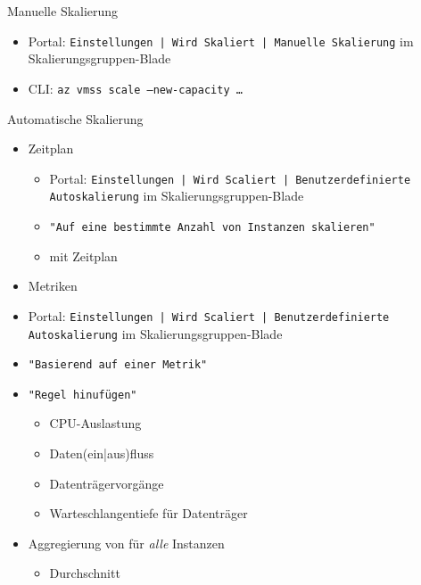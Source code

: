 \begin{flashcard}[Definition]{Manuelle Skalierung}
    \begin{itemize}
        \item Portal: \texttt{Einstellungen | Wird Skaliert | Manuelle Skalierung} im Skalierungsgruppen-Blade
        \item CLI: \texttt{az vmss scale --new-capacity \ldots}
    \end{itemize}
\end{flashcard}

\begin{flashcard}[Definition]{Automatische Skalierung}
    \begin{itemize}
        \item Zeitplan
            \begin{itemize}
                \item Portal: \texttt{Einstellungen | Wird Scaliert | Benutzerdefinierte Autoskalierung} im Skalierungsgruppen-Blade
                \item \texttt{"Auf eine bestimmte Anzahl von Instanzen skalieren"}
                \item mit Zeitplan
            \end{itemize}
        \item Metriken
            \item Portal: \texttt{Einstellungen | Wird Scaliert | Benutzerdefinierte Autoskalierung} im Skalierungsgruppen-Blade
            \item \texttt{"Basierend auf einer Metrik"}
            \item \texttt{"Regel hinufügen"}
            \begin{itemize}
                \item CPU-Auslastung
                \item Daten(ein|aus)fluss
                \item Datenträgervorgänge
                \item Warteschlangentiefe für Datenträger
            \end{itemize}
        \item Aggregierung von für \emph{alle} Instanzen
            \begin{itemize}
                \item Durchschnitt

\end{itemize}
\end{itemize}
\end{flashcard}

